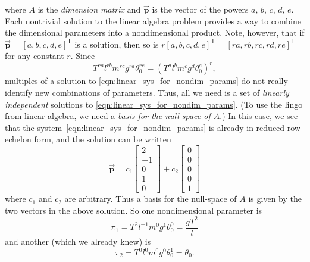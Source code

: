 \documentclass[reqno]{immbook}
\newcommand{\BP}{\vec{\textbf{p}}}
\numberwithin{equation}{chapter}
\numberwithin{question}{section}
\numberwithin{theorem}{chapter}
\numberwithin{figure}{chapter}
\theoremstyle{definition}
\begin{document}
where $A$ is the \emph{dimension matrix}
and  $\BP$ is the vector of the powers
$a$, $b$, $c$, $d$, $e$.
Each nontrivial solution to the
linear algebra problem provides a way
to combine the dimensional parameters
into a nondimensional product.
Note, however, that if
$\BP = \left[a,b,c,d,e\right]^{\textsf{T}}$ is a solution,
then so is $r\left[a,b,c,d,e\right]^{\textsf{T}} = \left[ra,rb,rc,rd,re\right]^{\textsf{T}}$
for any constant $r$.
Since
\begin{equation}
  T^{ra}l^{rb} m^{rc} g^{rd} \theta_0^{re}
   = \left(T^a l^b m^c g^d \theta_0^e\right)^r ,
\end{equation}
multiples of a solution to \eqref{eqn:linear_sys_for_nondim_params}
do not really identify new combinations of
parameters.
Thus, all we need is a set of
\emph{linearly independent} solutions
to \eqref{eqn:linear_sys_for_nondim_params}.
(To use the lingo from linear algebra, we need
a \emph{basis for the null-space of $A$}.)
In this case, we see that the system~\eqref{eqn:linear_sys_for_nondim_params}
is already in reduced row echelon form, and
the solution can be written
\begin{equation}
  \BP = c_1\begin{bmatrix} 2 \\ -1 \\ 0 \\ 1 \\ 0 \end{bmatrix} +
      c_2 \begin{bmatrix} 0 \\ 0 \\ 0 \\ 0 \\ 1 \end{bmatrix} 
\end{equation}
where $c_1$ and $c_2$ are arbitrary.  Thus a basis for the
null-space of $A$ is
given by the two vectors in the above solution.
So one nondimensional parameter is
\begin{equation}
   \pi_1 = T^2 l^{-1} m^0 g^1 \theta_0^0
         = \frac{gT^2}{l}
\end{equation}
and another (which we already knew) is
\begin{equation}
   \pi_2 = T^0 l^0 m^0 g^0 \theta_0^1
         = \theta_0 .
\end{equation}
\end{document}
